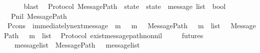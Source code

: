 \begin{isabellebody}
\ \ \ \ \isamarkupfalse%
\ blast\isanewline
{}\isamarkupfalse%
%
\endisatagproof
{\isafoldproof}%
%
\isadelimproof
\isanewline
%
\endisadelimproof
\isanewline
\isanewline
\isanewline
\isanewline
\isanewline
\isanewline
{}\isamarkupfalse%
\ {\isacharparenleft}\ Protocol{\isacharparenright}\ MessagePath\ {\isacharcolon}{\isacharcolon}\ {\isachardoublequoteopen}state\ {\isasymRightarrow}\ state\ {\isasymRightarrow}\ message\ list\ {\isasymRightarrow}\ bool{\isachardoublequoteclose}\ \isanewline
\ \ P{\isacharunderscore}nil{\isacharcolon}\ {\isachardoublequoteopen}MessagePath\ {\isasymsigma}\ {\isasymsigma}\ {\isacharbrackleft}{\isacharbrackright}{\isachardoublequoteclose}\isanewline
{\isacharbar}\ P{\isacharunderscore}cons{\isacharcolon}\ {\isachardoublequoteopen}{\isasymlbrakk}\ immediately{\isacharunderscore}next{\isacharunderscore}message\ {\isacharparenleft}{\isasymsigma}{\isacharcomma}\ m{\isacharparenright}{\isacharsemicolon}\ {\isasymsigma}\ {\isasymunion}\ {\isacharbraceleft}m{\isacharbraceright}\ {\isasymin}\ {\isasymSigma}{\isacharsemicolon}\ MessagePath\ {\isacharparenleft}{\isasymsigma}\ {\isasymunion}\ {\isacharbraceleft}m{\isacharbraceright}{\isacharparenright}\ {\isasymsigma}{\isacharprime}\ list\ {\isasymrbrakk}\ {\isasymLongrightarrow}\ MessagePath\ {\isasymsigma}\ {\isasymsigma}{\isacharprime}\ {\isacharparenleft}m\ {\isacharhash}\ list{\isacharparenright}{\isachardoublequoteclose}\isanewline
\isanewline
{}\isamarkupfalse%
\ {\isacharparenleft}\ Protocol{\isacharparenright}\ exist{\isacharunderscore}message{\isacharunderscore}path{\isacharunderscore}nonnil{\isacharcolon}\isanewline
\ \ \ {\isachardoublequoteopen}{\isasymsigma}{\isacharprime}\ {\isasymin}\ futures\ {\isasymsigma}{\isachardoublequoteclose}\isanewline
\ \ \ {\isachardoublequoteopen}{\isasymsigma}\ {\isasymin}\ {\isasymSigma}{\isachardoublequoteclose}\ {\isachardoublequoteopen}{\isasymsigma}{\isacharprime}\ {\isasymin}\ {\isasymSigma}{\isachardoublequoteclose}\ {\isachardoublequoteopen}{\isasymsigma}\ {\isasymnoteq}\ {\isasymsigma}{\isacharprime}{\isachardoublequoteclose}\isanewline
\ \ \ message{\isacharunderscore}list\ \ {\isachardoublequoteopen}MessagePath\ {\isasymsigma}\ {\isasymsigma}{\isacharprime}\ message{\isacharunderscore}list{\isachardoublequoteclose}\isanewline
%
\isadelimproof
%
\endisadelimproof
%
\isatagproof
{}\isamarkupfalse%
{\isacharminus}\isanewline
\ \ \isamarkupfalse%

\end{isabellebody}
